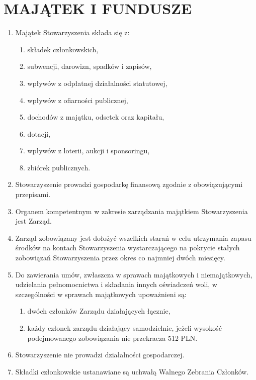 \documentclass{article}
\begin{document}
\section{MAJĄTEK I FUNDUSZE}
  \begin{enumerate}
    \item Majątek Stowarzyszenia składa się z:
      \begin{enumerate}
        \item składek członkowskich,
        \item subwencji, darowizn, spadków i zapisów,
        \item wpływów z odpłatnej działalności statutowej,
        \item wpływów z ofiarności publicznej,
        \item dochodów z majątku, odsetek oraz kapitału,
        \item dotacji,
        \item wpływów z loterii, aukcji i sponsoringu,
        \item zbiórek publicznych.
      \end{enumerate}
    \item Stowarzyszenie prowadzi gospodarkę finansową zgodnie z obowiązującymi przepisami.
    \item Organem kompetentnym w zakresie zarządzania majątkiem Stowarzyszenia jest Zarząd.
    \item Zarząd zobowiązany jest dołożyć wszelkich starań w celu utrzymania zapasu środków na kontach Stowarzyszenia wystarczającego na pokrycie stałych zobowiązań Stowarzyszenia przez okres co najmniej dwóch miesięcy.
    \item Do zawierania umów, zwłaszcza w sprawach majątkowych i niemajątkowych, udzielania pełnomocnictwa i składania innych oświadczeń woli, w szczególności w sprawach majątkowych upoważnieni są:
      \begin{enumerate}
        \item dwóch członków Zarządu działających łącznie,
        \item każdy członek zarządu działający samodzielnie, jeżeli wysokość podejmowanego zobowiązania nie przekracza 512 PLN.
      \end{enumerate}
    \item Stowarzyszenie nie prowadzi działalności gospodarczej.
    \item Składki członkowskie ustanawiane są uchwałą Walnego Zebrania Członków.
  \end{enumerate}
\end{document}
